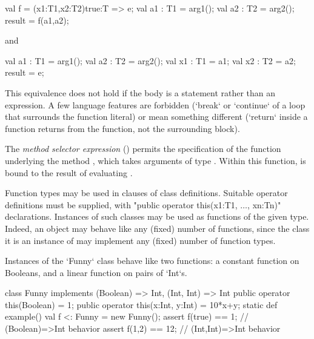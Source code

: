 \begin{xten}
{
  val f = (x1:T1,x2:T2){true}:T => e;
  val a1 : T1 = arg1();
  val a2 : T2 = arg2();
  result = f(a1,a2);
}
\end{xten}
and 
\begin{xten}
{
  val a1 : T1 = arg1();
  val a2 : T2 = arg2();
  {
     val x1 : T1 = a1;
     val x2 : T2 = a2;
     result = e;
  }  
}
\end{xten}
\noindent
This equivalence does not hold if the body is a statement rather than an expression.
A few language features are forbidden (\xcd`break` or \xcd`continue` of a loop
that surrounds the function literal) or mean something different (\xcd`return`
inside a function returns from the function, not the surrounding block). 


The \emph{method selector expression}  ()
permits the specification of the function underlying
the method , which takes arguments of type .
Within this function,  is bound to the result of evaluating .

Function types may be used in  clauses of class
definitions. Suitable operator definitions must be supplied, with 
\xcdmath"public operator this(x1:T1, $\ldots$, xn:Tn)" declarations.
Instances of such classes may be used as functions of the
given type.  Indeed, an object may behave like any (fixed) number of
functions, since the class it is an instance of may implement any
(fixed) number of function types.
\begin{eg}
Instances of the \xcd`Funny` class behave like two functions: 
a constant function on Booleans, and a linear function on 
pairs of \xcd`Int`s.  
\begin{xten}
class Funny implements (Boolean) => Int, 
                       (Int, Int) => Int
{
  public operator this(Boolean) = 1;
  public operator this(x:Int, y:Int) = 10*x+y;
  static def example() {
    val f <: Funny  = new Funny();
    assert f(true) == 1; // (Boolean)=>Int behavior
    assert f(1,2) == 12; // (Int,Int)=>Int behavior
  }
}
\end{xten}

\end{eg}


